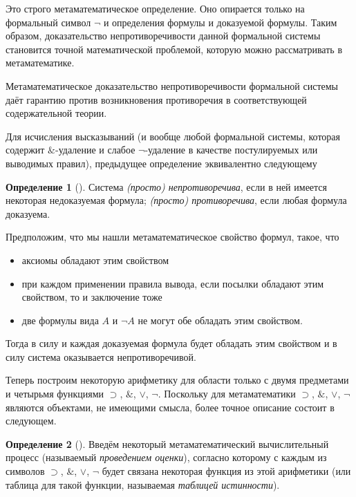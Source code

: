 \documentclass[a4paper, 12pt]{article}  %
\DeclareMathOperator{\conj}{\mathbb{\&}}
\theoremstyle{definition}
\newtheorem*{definition}{Определение}
\newcommand*\circled[1]{\tikz[baseline=(char.base)]{
		\node[shape=circle,draw,inner sep=2pt] (char) {#1};}}
\begin{document}
	Это строго метаматематическое определение. Оно опирается только на формальный символ $\neg$ и
	определения формулы и доказуемой формулы. Таким образом, доказательство непротиворечивости
	данной формальной системы становится точной математической проблемой, которую можно
	рассматривать в метаматематике.
	
	Метаматематическое доказательство непротиворечивости формальной системы даёт гарантию против
	возникновения противоречия в соответствующей содержательной теории.
	
	Для исчисления высказываний (и вообще любой формальной системы, которая содержит
	$\conj$-удаление и слабое $\neg$-удаление в качестве постулируемых или выводимых правил),
	предыдущее определение эквивалентно следующему
	
	\begin{definition}[]
		Система \textit{(просто) непротиворечива}, если в ней имеется некоторая недоказуемая
		формула; \textit{(просто) противоречива}, если любая формула доказуема.
	\end{definition}

	Предположим, что мы нашли метаматематическое свойство формул, такое, что
	\begin{itemize}[label={}]
		\setlength\itemsep{0pt}	
		\item \circled{a} аксиомы обладают этим свойством
		\item \circled{b} при каждом применении правила вывода, если посылки обладают этим
						 свойством, то и заключение тоже
		\item \circled{c} две формулы вида $A$ и $\neg A$ не могут обе обладать этим свойством.
	\end{itemize}

	Тогда в силу \circled{a} и \circled{b} каждая доказуемая формула будет обладать этим свойством и в силу \circled{c} система оказывается непротиворечивой.
	
	Теперь построим некоторую арифметику для области только с двумя предметами и четырьмя
	функциями $\supset$, $\conj$, $\vee$, $\neg$. Поскольку для метаматематики $\supset$, $\conj$,
	$\vee$, $\neg$ являются объектами, не имеющими смысла, более точное описание состоит в
	следующем. 
	
	\begin{definition}[]
		Введём некоторый метаматематический вычислительный процесс (называемый \textit{проведением
		оценки}), согласно которому с каждым из символов $\supset$, $\conj$, $\vee$, $\neg$ будет
		связана некоторая функция из этой арифметики (или таблица для такой функции, называемая
		\textit{таблицей истинности}).
	\end{definition}
\end{document}
